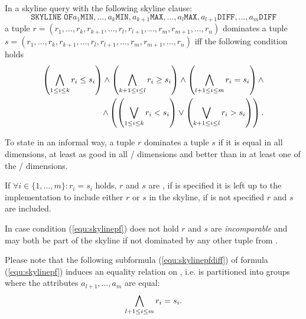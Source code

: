 In a skyline query with the following skyline clause:
\[
\texttt{SKYLINE OF} a_1 \texttt{MIN}, \ldots, a_k \texttt{MIN}, a_{k+1} \texttt{MAX}, \ldots, a_l \texttt{MAX}, a_{l+1} \texttt{DIFF}, \ldots, a_m \texttt{DIFF}
\]
a tuple 
$r = (r_1, \ldots, r_k, r_{k+1}, \ldots, r_l, r_{l+1}, \ldots, r_m, r_{m+1}, \ldots, r_n)$
dominates a tuple
$s = (r_1, \ldots, r_k, r_{k+1}, \ldots, r_l, r_{l+1}, \ldots, r_m, r_{m+1}, \ldots, r_n)$
iff the following condition holds
\begin{eqnarray}\label{equ:skylinepf}
\left( \bigwedge_{1 \le i \le k} r_i \le s_i \right) \land
\left( \bigwedge_{k+1 \le i \le l} r_i \ge s_i \right) \land
\left( \bigwedge_{l+1 \le i \le m} r_i = s_i \right) \land \nonumber\\
\land
\left( \left( \bigvee_{1 \le i \le k} r_i < s_i \right) \lor
       \left( \bigvee_{k+1 \le i \le l} r_i > s_i \right) \right).
\end{eqnarray}

To state in an informal way, a tuple $r$ dominates a tuple $s$ if it is equal in all  dimensions, at least as good in all / dimensions and better than in at least one of the / dimensions.



If $\forall i \in \{1, \ldots, m\}: r_i = s_i$ holds, $r$ and $s$ are , if  is specified it is left up to the implementation to include either $r$ or $s$ in the skyline, if  is not specified $r$ and $s$ are included. 


In case condition (\ref{equ:skylinepf}) does not hold $r$ and $s$ are \emph{incomparable} and may both be part of the skyline if not dominated by any other tuple from .

Please note that the following subformula (\ref{equ:skylinepfdiff}) of formula (\ref{equ:skylinepf}) induces an equality relation on , i.e.  is partitioned into groups where the attributes $a_{l+1}, \ldots, a_m$ are equal:
\begin{equation}\label{equ:skylinepfdiff}
\bigwedge_{l+1 \le i \le m} r_i = s_i.
\end{equation}

